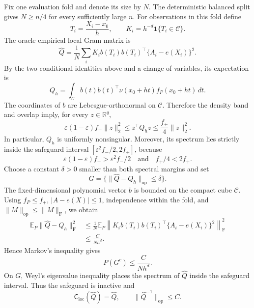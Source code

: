 Fix one evaluation fold and denote its size by \(N\).  The deterministic balanced split gives \(N\geq n/4\) for every sufficiently large \(n\).  For observations in this fold define
\[
T_i=\frac{X_i-x_0}{h},
\qquad
K_i=h^{-d}\mathbf 1\{T_i\in\mathcal C\}.
\]
The oracle empirical local Gram matrix is
\[
\widehat Q
=\frac1N\sum_i K_i b(T_i)b(T_i)^\top\{A_i-e(X_i)\}^2.
\]
By the two conditional identities above and a change of variables, its expectation is
\[
Q_h
=\int_{\mathcal C}b(t)b(t)^\top
\nu(x_0+ht)f_P(x_0+ht)\,dt.
\]
The coordinates of \(b\) are Lebesgue-orthonormal on \(\mathcal C\).  Therefore the density band and overlap imply, for every \(z\in\mathbb R^q\),
\[
\varepsilon(1-\varepsilon)f_-\lVert z\rVert_2^2
\leq z^\top Q_hz
\leq \frac{f_+}{4}\lVert z\rVert_2^2.
\]
In particular, \(Q_h\) is uniformly nonsingular.  Moreover, its spectrum lies strictly inside the safeguard interval \([\varepsilon^2f_-/2,2f_+]\), because
\[
\varepsilon(1-\varepsilon)f_->\varepsilon^2f_-/2
\quad\text{and}\quad
f_+/4<2f_+.
\]
Choose a constant \(\delta>0\) smaller than both spectral margins and set
\[
G=\{\lVert\widehat Q-Q_h\rVert_{\mathrm{op}}\leq\delta\}.
\]
The fixed-dimensional polynomial vector \(b\) is bounded on the compact cube \(\mathcal C\).  Using \(f_P\leq f_+\), \(|A-e(X)|\leq1\), independence within the fold, and \(\lVert M\rVert_{\mathrm{op}}\leq\lVert M\rVert_{\mathrm F}\), we obtain
\[
\begin{aligned}
\mathbb E_P\lVert\widehat Q-Q_h\rVert_{\mathrm F}^2
&\leq \frac{1}{N}\mathbb E_P
 \left\lVert K_i b(T_i)b(T_i)^\top\{A_i-e(X_i)\}^2\right\rVert_{\mathrm F}^2\\
&\leq \frac{C}{Nh^d}.
\end{aligned}
\]
Hence Markov's inequality gives
\[
P(G^c)\leq\frac{C}{Nh^d}.
\]
On \(G\), Weyl's eigenvalue inequality places the spectrum of \(\widehat Q\) inside the safeguard interval.  Thus the safeguard is inactive and
\[
\mathsf C_{\mathrm{loc}}(\widehat Q)=\widehat Q,
\qquad
\lVert\widehat Q^{-1}\rVert_{\mathrm{op}}\leq C.
\]

